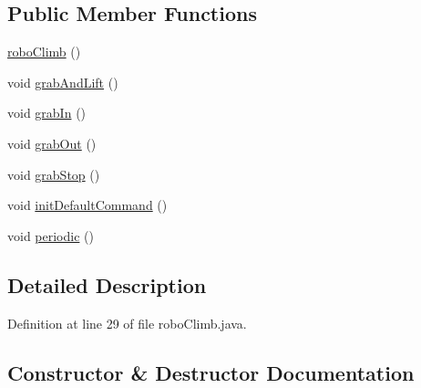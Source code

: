 \subsection*{Public Member Functions}
\begin{DoxyCompactItemize}
\item 
\mbox{\hyperlink{classorg_1_1usfirst_1_1frc3707_1_1_creedence_1_1subsystems_1_1robo_climb_aaff8679a19bfeee10db8aa6921295485}{robo\+Climb}} ()
\item 
void \mbox{\hyperlink{classorg_1_1usfirst_1_1frc3707_1_1_creedence_1_1subsystems_1_1robo_climb_a500abc097c15dddecb2086d388556753}{grab\+And\+Lift}} ()
\item 
void \mbox{\hyperlink{classorg_1_1usfirst_1_1frc3707_1_1_creedence_1_1subsystems_1_1robo_climb_a9e180569929a5df34178a18c37842980}{grab\+In}} ()
\item 
void \mbox{\hyperlink{classorg_1_1usfirst_1_1frc3707_1_1_creedence_1_1subsystems_1_1robo_climb_a5d271be23e7cd5f057f00bd2ae2f44b2}{grab\+Out}} ()
\item 
void \mbox{\hyperlink{classorg_1_1usfirst_1_1frc3707_1_1_creedence_1_1subsystems_1_1robo_climb_aae912f4b8ddb15dff86d33ded925e0ff}{grab\+Stop}} ()
\item 
void \mbox{\hyperlink{classorg_1_1usfirst_1_1frc3707_1_1_creedence_1_1subsystems_1_1robo_climb_a9d565bb961e6b4e37ab1ba1096f45518}{init\+Default\+Command}} ()
\item 
void \mbox{\hyperlink{classorg_1_1usfirst_1_1frc3707_1_1_creedence_1_1subsystems_1_1robo_climb_a03cd52a86be8f78cd25b8c3406f971bd}{periodic}} ()
\end{DoxyCompactItemize}


\subsection{Detailed Description}


Definition at line 29 of file robo\+Climb.\+java.



\subsection{Constructor \& Destructor Documentation}
\mbox{\label{classorg_1_1usfirst_1_1frc3707_1_1_creedence_1_1subsystems_1_1robo_climb_aaff8679a19bfeee10db8aa6921295485}} 

